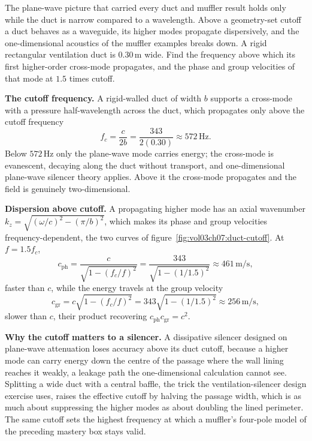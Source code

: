 

The plane-wave picture that carried every duct and muffler result holds
only while the duct is narrow compared to a wavelength. Above a geometry-set
cutoff a duct behaves as a waveguide, its higher modes propagate
dispersively, and the one-dimensional acoustics of the muffler examples
breaks down. A rigid rectangular ventilation duct is
$0.30\,\si{\meter}$ wide. Find the frequency above which its first
higher-order cross-mode propagates, and the phase and group velocities of
that mode at $1.5$ times cutoff.

\textbf{The cutoff frequency.} A rigid-walled duct of width $b$ supports a
cross-mode with a pressure half-wavelength across the duct, which propagates
only above the cutoff frequency
\[
f_c = \frac{c}{2b} = \frac{343}{2(0.30)} \approx 572\,\si{\hertz}.
\]
Below $572\,\si{\hertz}$ only the plane-wave mode carries energy; the
cross-mode is evanescent, decaying along the duct without transport, and
one-dimensional plane-wave silencer theory applies. Above it the cross-mode
propagates and the field is genuinely two-dimensional.

\textbf{Dispersion above cutoff.} A propagating higher mode has an axial
wavenumber $k_z = \sqrt{(\omega/c)^2 - (\pi/b)^2}$, which makes its phase and
group velocities frequency-dependent, the two curves of
figure~\ref{fig:vol03ch07:duct-cutoff}. At $f = 1.5 f_c$,
\[
c_{\text{ph}} = \frac{c}{\sqrt{1-(f_c/f)^2}}
             = \frac{343}{\sqrt{1-(1/1.5)^2}}
             \approx 461\,\si{\meter\per\second},
\]
faster than $c$, while the energy travels at the group velocity
\[
c_{\text{gr}} = c\sqrt{1-(f_c/f)^2}
             = 343\sqrt{1-(1/1.5)^2}
             \approx 256\,\si{\meter\per\second},
\]
slower than $c$, their product recovering $c_{\text{ph}}c_{\text{gr}}=c^2$.

\textbf{Why the cutoff matters to a silencer.} A dissipative silencer
designed on plane-wave attenuation loses accuracy above its duct cutoff,
because a higher mode can carry energy down the centre of the passage where
the wall lining reaches it weakly, a leakage path the one-dimensional
calculation cannot see. Splitting a wide duct with a central baffle, the
trick the ventilation-silencer design exercise uses, raises the effective
cutoff by halving the passage width, which is as much about suppressing the
higher modes as about doubling the lined perimeter. The same cutoff sets the
highest frequency at which a muffler's four-pole model of the preceding
mastery box stays valid.

